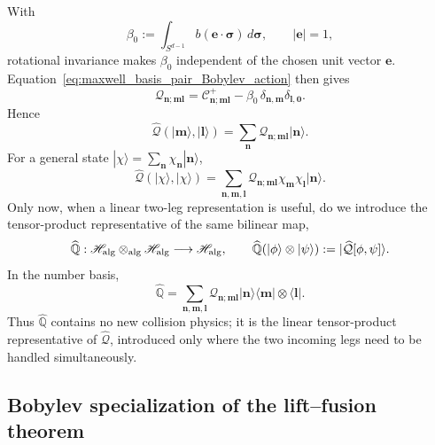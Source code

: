 \documentclass[11pt,oneside]{article}
\numberwithin{equation}{section}
\theoremstyle{definition}
\begin{document}
With
\begin{equation}
 \beta_0:=\int_{S^{d-1}}b(\bm e\!\cdot\!\bm\sigma)\,d\bm\sigma,
 \qquad |\bm e|=1,
\label{eq:maxwell_beta0_def}
\end{equation}
rotational invariance makes $\beta_0$ independent of the chosen unit vector $\bm e$.  Equation~\eqref{eq:maxwell_basis_pair_Bobylev_action} then gives
\begin{equation}
\mathcal Q_{\bm n;\bm m\bm l}
=
\mathcal C^{+}_{\bm n;\bm m\bm l}
-
\beta_0\,\delta_{\bm n,\bm m}\delta_{\bm l,\bm0}.
\label{eq:maxwell_Q_matrix_from_Bobylev}
\end{equation}
Hence
\begin{equation}
\widehat{\mathcal Q}(|\bm m\rangle,|\bm l\rangle)
=
\sum_{\bm n}
\mathcal Q_{\bm n;\bm m\bm l}|\bm n\rangle .
\label{eq:maxwell_basis_pair_output}
\end{equation}
For a general state $|\chi\rangle=\sum_{\bm n}\chi_{\bm n}|\bm n\rangle$,
\begin{equation}
\widehat{\mathcal Q}(|\chi\rangle,|\chi\rangle)
=
\sum_{\bm n,\bm m,\bm l}
\mathcal Q_{\bm n;\bm m\bm l}
\chi_{\bm m}\chi_{\bm l}|\bm n\rangle .
\label{eq:maxwell_Q_components}
\end{equation}
Only now, when a linear two-leg representation is useful, do we introduce the tensor-product representative of the same bilinear map,
\begin{equation}
\widehat{\mathbb Q}:
\mathscr H_{\rm alg}\otimes_{\rm alg}\mathscr H_{\rm alg}
\longrightarrow\mathscr H_{\rm alg},
\qquad
\widehat{\mathbb Q}(|\phi\rangle\otimes|\psi\rangle)
:=|\widehat{\mathcal Q}[\phi,\psi]\rangle .
\label{eq:maxwell_Q_tensor_from_bilinear}
\end{equation}
In the number basis,
\begin{equation}
\widehat{\mathbb Q}
=
\sum_{\bm n,\bm m,\bm l}
\mathcal Q_{\bm n;\bm m\bm l}
|\bm n\rangle\langle\bm m|\otimes\langle\bm l|.
\label{eq:maxwell_rank3_vertex}
\end{equation}
Thus $\widehat{\mathbb Q}$ contains no new collision physics; it is the linear tensor-product representative of $\widehat{\mathcal Q}$, introduced only where the two incoming legs need to be handled simultaneously.

\subsection{Bobylev specialization of the lift--fusion theorem}
\label{subsec:maxwell_gamma_m}
\end{document}
